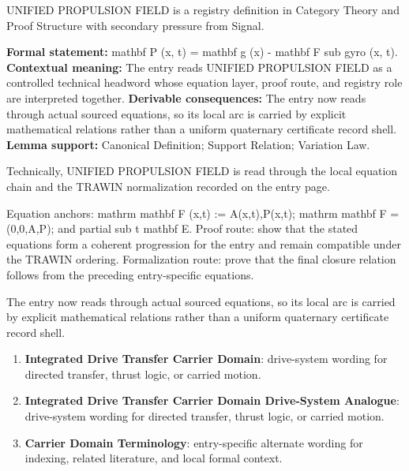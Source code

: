 
\begingroup\small
{}
UNIFIED PROPULSION FIELD is a registry definition in Category Theory and Proof Structure with secondary pressure from Signal.

\begingroup\footnotesize\setlength{\emergencystretch}{3em}\sloppy
\textbf{Formal statement:} mathbf P (x, t) = mathbf g (x) - mathbf F sub gyro (x, t). \textbf{Contextual meaning:} The entry reads UNIFIED PROPULSION FIELD as a controlled technical headword whose equation layer, proof route, and registry role are interpreted together. \textbf{Derivable consequences:} The entry now reads through actual sourced equations, so its local arc is carried by explicit mathematical relations rather than a uniform quaternary certificate record shell. \textbf{Lemma support:} Canonical Definition; Support Relation; Variation Law.\par
\endgroup

Technically, UNIFIED PROPULSION FIELD is read through the local equation chain and the TRAWIN normalization recorded on the entry page.

Equation anchors: mathrm mathbf F (x,t) := A(x,t),P(x,t); mathrm mathbf F = (0,0,A,P); and partial sub t mathbf E. Proof route: show that the stated equations form a coherent progression for the entry and remain compatible under the TRAWIN ordering. Formalization route: prove that the final closure relation follows from the preceding entry-specific equations.

The entry now reads through actual sourced equations, so its local arc is carried by explicit mathematical relations rather than a uniform quaternary certificate record shell.
\endgroup

\begin{enumerate}[leftmargin=1.6em,itemsep=6pt,topsep=4pt]
\item \textbf{Integrated Drive Transfer Carrier Domain}: drive-system wording for directed transfer, thrust logic, or carried motion.
\item \textbf{Integrated Drive Transfer Carrier Domain Drive-System Analogue}: drive-system wording for directed transfer, thrust logic, or carried motion.
\item \textbf{Carrier Domain Terminology}: entry-specific alternate wording for indexing, related literature, and local formal context.
\end{enumerate}

